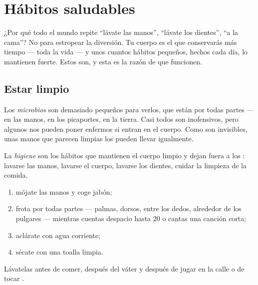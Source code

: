 \chapter{Hábitos saludables}\label{ch:g1:healthy-habits}

¿Por qué todo el mundo repite ``lávate las manos'', ``lávate los
dientes'', ``a la cama''? No para estropear la diversión. Tu cuerpo es
el  que conservarás más tiempo --- toda la vida --- y unos
cuantos hábitos pequeños, hechos cada día, lo mantienen fuerte. Estos
son, y esta es la razón de que funcionen.

\section{Estar limpio}

\begin{definition}[Microbios]\label{def:g1:healthy-habits:germs}
Los \emph{microbios} son  demasiado
pequeños para verlos, que están por todas partes --- en las manos, en
los picaportes, en la tierra. Casi todos son inofensivos, pero algunos
nos pueden poner enfermos si entran en el cuerpo. Como son invisibles,
unas manos que parecen limpias los pueden llevar igualmente.
\end{definition}

\begin{definition}[Higiene]\label{def:g1:healthy-habits:hygiene}
La \emph{higiene} son los hábitos que mantienen el
cuerpo limpio y dejan fuera a los : lavarse las manos, lavarse
el cuerpo, lavarse los dientes, cuidar la limpieza de la comida.
\end{definition}

\begin{method}\label{met:g1:healthy-habits:hands}
\begin{enumerate}
  \item mójate las manos y coge jabón;
  \item frota por todas partes --- palmas, dorsos, entre los dedos,
        alrededor de los pulgares --- mientras cuentas despacio hasta
        $20$ o cantas una canción corta;
  \item aclárate con agua corriente;
  \item sécate con una toalla limpia.
\end{enumerate}
Lávatelas antes de comer, después del váter y después de jugar en la
calle o de tocar .
\end{method}

